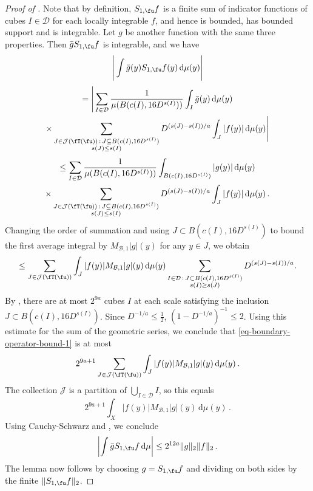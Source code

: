 \begin{proof}[Proof of ]
    \leanok
    Note that by definition, $S_{1,\fu}f$ is a finite sum of indicator functions of cubes $I \in \mathcal{D}$ for each locally integrable $f$, and hence is bounded, has bounded support and is integrable. Let $g$ be another function with the same three properties. Then $\bar g S_{1,\fu}f$ is integrable, and we have
    $$
        \Bigg|\int \bar g(y) S_{1,\fu}f(y) \, \mathrm{d}\mu(y)\Bigg|
    $$
    \begin{multline*}
        = \Bigg|\sum_{I\in\mathcal{D}} \frac{1}{\mu(B(c(I), 16 D^{s(I)}))} \int_I \bar g(y) \, \mathrm{d}\mu(y)\\
        \times \sum_{\substack{J\in \mathcal{J}(\fT(\fu))\,:\,J\subseteq B(c(I), 16 D^{s(I)})\\s(J)\le s(I)}} D^{(s(J)-s(I))/a}\int_J |f(y)| \,\mathrm{d}\mu(y)\Bigg|
    \end{multline*}
    \begin{multline*}
        \le \sum_{I\in\mathcal{D}} \frac{1}{\mu(B(c(I), 16D^{s(I)}))} \int_{B(c(I), 16D^{s(I)})} | g(y)| \, \mathrm{d}\mu(y)\\ \times \sum_{\substack{J\in \mathcal{J}(\fT(\fu))\,:\,J\subseteq B(c(I), 16 D^{s(I)})\\ s(J) \le s(I)}} D^{(s(J)-s(I))/a}\int_J |f(y)| \,\mathrm{d}\mu(y)\,.
    \end{multline*}
    Changing the order of summation and using $J \subset B(c(I), 16 D^{s(I)})$ to bound the first average integral by $M_{\mathcal{B},1}|g|(y)$ for any $y \in J$, we obtain
    \begin{align}
    \label{eq-boundary-operator-bound-1}
        \le \sum_{J\in\mathcal{J}(\fT(\fu))}\int_J|f(y)| M_{\mathcal{B},1}|g|(y) \, \mathrm{d}\mu(y) \sum_{\substack{I \in \mathcal{D} \, : \, J\subset B(c(I),16 D^{s(I)})\\ s(I) \ge s(J)}} D^{(s(J)-s(I))/a}.
    \end{align}
    By , there are at most $2^{9a}$ cubes $I$ at each scale satisfying the inclusion $J \subset B(c(I),16D^{s(I)})$.
    Since $D^{-1/a}\le\frac12$, $(1 - D^{-1/a})^{-1} \le 2$.
    Using this estimate for the sum of the geometric series, we conclude that \eqref{eq-boundary-operator-bound-1} is at most
    $$
        2^{9a+1} \sum_{J\in\mathcal{J}(\fT(\fu))}\int_J|f(y)| M_{\mathcal{B},1}|g|(y) \, \mathrm{d}\mu(y)\,.
    $$
    The collection $\mathcal{J}$ is a partition of $\bigcup_{I \in \mathcal{D}} I$, so this equals
    $$
        2^{9a+1} \int_X|f(y)| M_{\mathcal{B},1}|g|(y) \, \mathrm{d}\mu(y)\,.
    $$
    Using Cauchy-Schwarz and , we conclude
    $$
        \left|\int \bar g S_{1,\fu}f \, \mathrm{d}\mu \right| \le 2^{12a} \|g\|_2\|f\|_2\,.
    $$
    The lemma now follows by choosing $g = S_{1,\fu}f$ and dividing on both sides by the finite $\|S_{1,\fu}f\|_2$.
\end{proof}

